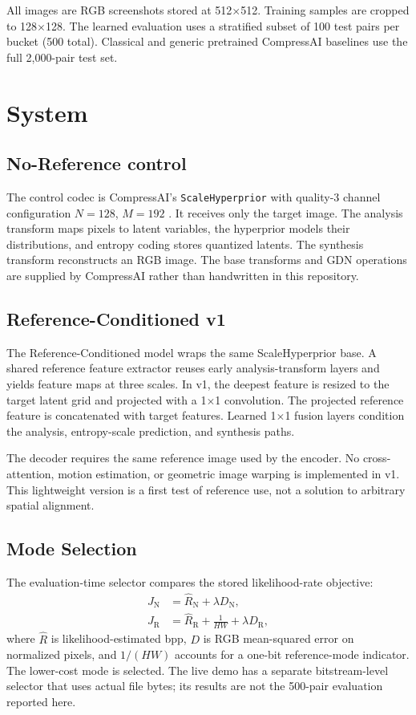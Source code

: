 \documentclass[conference]{IEEEtran}
\begin{document}
All images are RGB screenshots stored at 512$\times$512. Training samples are cropped to 128$\times$128. The learned evaluation uses a stratified subset of 100 test pairs per bucket (500 total). Classical and generic pretrained CompressAI baselines use the full 2,000-pair test set.

\section{System}
\subsection{No-Reference control}
The control codec is CompressAI's \texttt{ScaleHyperprior} with quality-3 channel configuration $N=128$, $M=192$ \cite{balle2018}. It receives only the target image. The analysis transform maps pixels to latent variables, the hyperprior models their distributions, and entropy coding stores quantized latents. The synthesis transform reconstructs an RGB image. The base transforms and GDN operations are supplied by CompressAI rather than handwritten in this repository.

\subsection{Reference-Conditioned v1}
The Reference-Conditioned model wraps the same ScaleHyperprior base. A shared reference feature extractor reuses early analysis-transform layers and yields feature maps at three scales. In v1, the deepest feature is resized to the target latent grid and projected with a 1$\times$1 convolution. The projected reference feature is concatenated with target features. Learned 1$\times$1 fusion layers condition the analysis, entropy-scale prediction, and synthesis paths.

The decoder requires the same reference image used by the encoder. No cross-attention, motion estimation, or geometric image warping is implemented in v1. This lightweight version is a first test of reference use, not a solution to arbitrary spatial alignment.

\subsection{Mode Selection}
The evaluation-time selector compares the stored likelihood-rate objective:
\begin{align}
J_{\mathrm{N}} &= \widehat{R}_{\mathrm{N}}+\lambda D_{\mathrm{N}},\\
J_{\mathrm{R}} &= \widehat{R}_{\mathrm{R}}+\frac{1}{HW}+\lambda D_{\mathrm{R}},
\end{align}
where $\widehat{R}$ is likelihood-estimated bpp, $D$ is RGB mean-squared error on normalized pixels, and $1/(HW)$ accounts for a one-bit reference-mode indicator. The lower-cost mode is selected. The live demo has a separate bitstream-level selector that uses actual file bytes; its results are not the 500-pair evaluation reported here.
\end{document}
